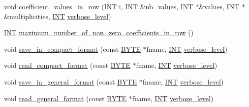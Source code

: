 \begin{DoxyCompactItemize}
\item 
void \mbox{\hyperlink{classdiophant_a73ad334fe00ecdaa812aa65175af08d2}{coefficient\+\_\+values\+\_\+in\+\_\+row}} (\mbox{\hyperlink{galois_8h_a09fddde158a3a20bd2dcadb609de11dc}{I\+NT}} \mbox{\hyperlink{alphabet2_8_c_acb559820d9ca11295b4500f179ef6392}{i}}, \mbox{\hyperlink{galois_8h_a09fddde158a3a20bd2dcadb609de11dc}{I\+NT}} \&nb\+\_\+values, \mbox{\hyperlink{galois_8h_a09fddde158a3a20bd2dcadb609de11dc}{I\+NT}} $\ast$\&values, \mbox{\hyperlink{galois_8h_a09fddde158a3a20bd2dcadb609de11dc}{I\+NT}} $\ast$\&multiplicities, \mbox{\hyperlink{galois_8h_a09fddde158a3a20bd2dcadb609de11dc}{I\+NT}} \mbox{\hyperlink{simeon_8_c_a818073fbcc2f439e7c56952f67386122}{verbose\+\_\+level}})
\item 
\mbox{\hyperlink{galois_8h_a09fddde158a3a20bd2dcadb609de11dc}{I\+NT}} \mbox{\hyperlink{classdiophant_a5644464dd4854d44f217534cd57aa740}{maximum\+\_\+number\+\_\+of\+\_\+non\+\_\+zero\+\_\+coefficients\+\_\+in\+\_\+row}} ()
\item 
void \mbox{\hyperlink{classdiophant_a7119e1f2b15ffe94385227cf731b7e8e}{save\+\_\+in\+\_\+compact\+\_\+format}} (const \mbox{\hyperlink{galois_8h_ab6cc7b4aeb6ea31aba2b3fbfc83ff5e6}{B\+Y\+TE}} $\ast$fname, \mbox{\hyperlink{galois_8h_a09fddde158a3a20bd2dcadb609de11dc}{I\+NT}} \mbox{\hyperlink{simeon_8_c_a818073fbcc2f439e7c56952f67386122}{verbose\+\_\+level}})
\item 
void \mbox{\hyperlink{classdiophant_a8cf43adfae9ea53b58c6388c50bcd368}{read\+\_\+compact\+\_\+format}} (const \mbox{\hyperlink{galois_8h_ab6cc7b4aeb6ea31aba2b3fbfc83ff5e6}{B\+Y\+TE}} $\ast$fname, \mbox{\hyperlink{galois_8h_a09fddde158a3a20bd2dcadb609de11dc}{I\+NT}} \mbox{\hyperlink{simeon_8_c_a818073fbcc2f439e7c56952f67386122}{verbose\+\_\+level}})
\item 
void \mbox{\hyperlink{classdiophant_a6a0683cb64cd550310bc09ea78e2c13f}{save\+\_\+in\+\_\+general\+\_\+format}} (const \mbox{\hyperlink{galois_8h_ab6cc7b4aeb6ea31aba2b3fbfc83ff5e6}{B\+Y\+TE}} $\ast$fname, \mbox{\hyperlink{galois_8h_a09fddde158a3a20bd2dcadb609de11dc}{I\+NT}} \mbox{\hyperlink{simeon_8_c_a818073fbcc2f439e7c56952f67386122}{verbose\+\_\+level}})
\item 
void \mbox{\hyperlink{classdiophant_a1887f195bdb2f597aa7eedc55cb8a211}{read\+\_\+general\+\_\+format}} (const \mbox{\hyperlink{galois_8h_ab6cc7b4aeb6ea31aba2b3fbfc83ff5e6}{B\+Y\+TE}} $\ast$fname, \mbox{\hyperlink{galois_8h_a09fddde158a3a20bd2dcadb609de11dc}{I\+NT}} \mbox{\hyperlink{simeon_8_c_a818073fbcc2f439e7c56952f67386122}{verbose\+\_\+level}})

\end{DoxyCompactItemize}
